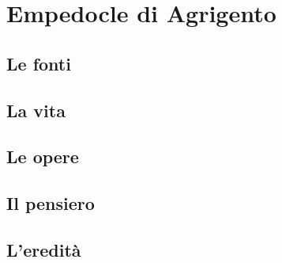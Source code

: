 \chapter{Empedocle di Agrigento}

\section{Le fonti}

\section{La vita}

\section{Le opere}

\section{Il pensiero}

\section{L'eredità}
